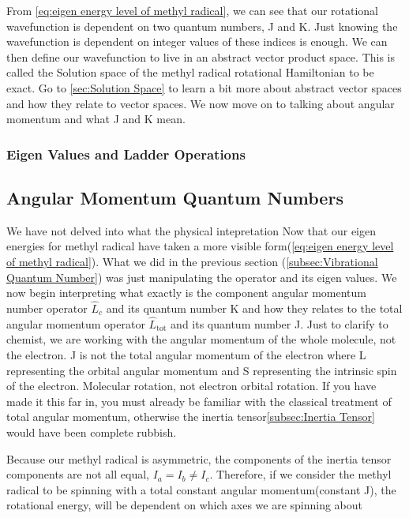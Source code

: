 \documentclass[11pt,a4paper]{book}
\begin{document}
			From \autoref{eq:eigen energy level of methyl radical}, we can see that our rotational wavefunction is dependent on two quantum numbers, J and K. Just knowing the wavefunction is dependent on integer values of these indices is enough. We can then define our wavefunction to live in an abstract vector product space. This is called the Solution space of the methyl radical rotational Hamiltonian to be exact. Go to \autoref{sec:Solution Space} to learn a bit more about abstract vector spaces and how they relate to vector spaces. We now move on to talking about angular momentum and what J and K mean.

			\subsubsection{Eigen Values and Ladder Operations}
				\label{subsubsec:Eigen Values and Ladder Operations}
		\subsection{Angular Momentum Quantum Numbers}
			\label{subsec:Angular Momentum}
			We have not delved into what the physical intepretation
			Now that our eigen energies for methyl radical have taken a more visible form(\autoref{eq:eigen energy level of methyl radical}). What we did in the previous section (\autoref{subsec:Vibrational Quantum Number}) was just manipulating the operator and its eigen values. We now begin interpreting what exactly is the component angular momentum number operator $\hat{L}_c$ and its quantum number K and how they relates to the total angular momentum operator $\hat{L}_{\text{tot}}$ and its quantum number J. Just to clarify to chemist, we are working with the angular momentum of the whole molecule, not the electron. J is not the total angular momentum of the electron where  L representing the orbital angular momentum and S representing the intrinsic spin of the electron. Molecular rotation, not electron orbital rotation. If you have made it this far in, you must already be familiar with the classical treatment of total angular momentum, otherwise the inertia tensor\autoref{subsec:Inertia Tensor} would have been complete rubbish. 
			
			Because our methyl radical is asymmetric, the components of the inertia tensor components are not all equal, $I_a = I_b \neq I_c$. Therefore, if we consider the methyl radical to be spinning with a total constant angular momentum(constant J), the rotational energy, will be dependent on which axes we are spinning about
			
\end{document}
